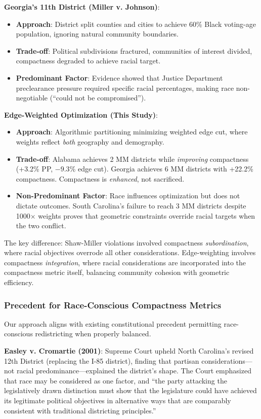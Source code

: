 \textbf{Georgia's 11th District (Miller v. Johnson)}:
\begin{itemize}
    \item \textbf{Approach}: District split counties and cities to achieve 60\% Black voting-age population, ignoring natural community boundaries.
    \item \textbf{Trade-off}: Political subdivisions fractured, communities of interest divided, compactness degraded to achieve racial target.
    \item \textbf{Predominant Factor}: Evidence showed that Justice Department preclearance pressure required specific racial percentages, making race non-negotiable (``could not be compromised'').
\end{itemize}

\textbf{Edge-Weighted Optimization (This Study)}:
\begin{itemize}
    \item \textbf{Approach}: Algorithmic partitioning minimizing weighted edge cut, where weights reflect \emph{both} geography and demography.
    \item \textbf{Trade-off}: Alabama achieves 2 MM districts while \emph{improving} compactness (+3.2\% PP, $-9.3$\% edge cut). Georgia achieves 6 MM districts with +22.2\% compactness. Compactness is \emph{enhanced}, not sacrificed.
    \item \textbf{Non-Predominant Factor}: Race influences optimization but does not dictate outcomes. South Carolina's failure to reach 3 MM districts despite 1000$\times$ weights proves that geometric constraints override racial targets when the two conflict.
\end{itemize}

The key difference: Shaw-Miller violations involved compactness \emph{subordination}, where racial objectives overrode all other considerations. Edge-weighting involves compactness \emph{integration}, where racial considerations are incorporated into the compactness metric itself, balancing community cohesion with geometric efficiency.

\subsubsection{Precedent for Race-Conscious Compactness Metrics}

Our approach aligns with existing constitutional precedent permitting race-conscious redistricting when properly balanced.

\textbf{Easley v. Cromartie (2001)}: Supreme Court upheld North Carolina's revised 12th District (replacing the I-85 district), finding that partisan considerations---not racial predominance---explained the district's shape. The Court emphasized that race may be considered as one factor, and ``the party attacking the legislatively drawn distinction must show that the legislature could have achieved its legitimate political objectives in alternative ways that are comparably consistent with traditional districting principles.''

